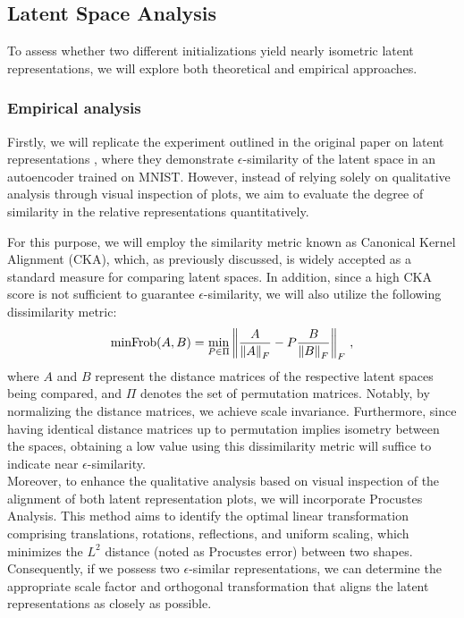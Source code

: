 \documentclass[../main.tex]{subfiles}
\begin{document}
\subsection{Latent Space Analysis}
To assess whether two different initializations yield nearly isometric latent representations, we will explore both theoretical and empirical approaches.

\subsubsection*{Empirical analysis}
Firstly, we will replicate the experiment outlined in the original paper on latent representations \cite{moschella_relative_2022}, where they demonstrate $\epsilon$-similarity of the latent space in an autoencoder trained on MNIST. However, instead of relying solely on qualitative analysis through visual inspection of plots, we aim to evaluate the degree of similarity in the relative representations quantitatively.

For this purpose, we will employ the similarity metric known as Canonical Kernel Alignment (CKA), which, as previously discussed, is widely accepted as a standard measure for comparing latent spaces. In addition, since a high CKA score is not sufficient to guarantee $\epsilon$-similarity, we will also utilize the following dissimilarity metric:
\[
\text{minFrob}(A,B) = \min_{P\in \Pi} \left\lVert \dfrac{A}{\left\lVert A \right\rVert_F} - P\dfrac{B}{\left\lVert B \right\rVert_F} \right\rVert_F\,,
\]
where $A$ and $B$ represent the distance matrices of the respective latent spaces being compared, and $\Pi$ denotes the set of permutation matrices. Notably, by normalizing the distance matrices, we achieve scale invariance. Furthermore, since having identical distance matrices up to permutation implies isometry between the spaces, obtaining a low value using this dissimilarity metric will suffice to indicate near $\epsilon$-similarity.\\

Moreover, to enhance the qualitative analysis based on visual inspection of the alignment of both latent representation plots, we will incorporate Procustes Analysis. This method aims to identify the optimal linear transformation comprising translations, rotations, reflections, and uniform scaling, which minimizes the $L^2$ distance (noted as Procustes error) between two shapes. Consequently, if we possess two $\epsilon$-similar representations, we can determine the appropriate scale factor and orthogonal transformation that aligns the latent representations as closely as possible.
\end{document}
